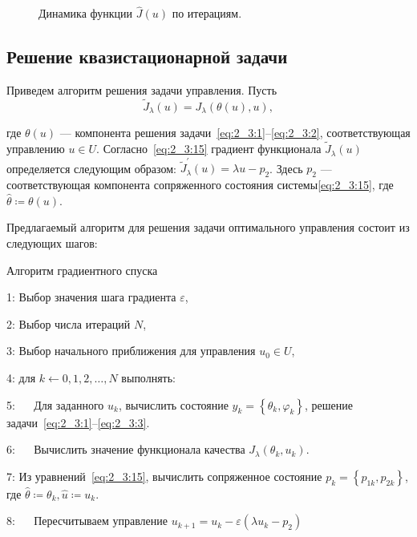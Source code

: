 \begin{figure}[]
    \centering
    \caption{Динамика функции $\hat{J}(u)$ по итерациям.}
    \label{fig:4_3:cost}
\end{figure}


\subsection{Решение квазистационарной задачи}
\label{subsec:ch4/sec3/quasistationary}
Приведем алгоритм решения задачи управления.
Пусть
\[
    \widetilde{J}_{\lambda}(u)=J_{\lambda}(\theta(u), u),
\]

где $\theta(u)$ — компонента решения
задачи~\eqref{eq:2_3:1}--\eqref{eq:2_3:2},
соответствующая управлению $u \in U$.
Согласно~\eqref{eq:2_3:15} градиент функционала
$\widetilde{J}_{\lambda}(u)$ определяется
следующим образом: $\widetilde{J}_{\lambda}^{\prime}(u) = \lambda u-p_{2}$.
Здесь $p_{2}$ — соответствующая компонента сопряженного
состояния системы\eqref{eq:2_3:15}, где $\widehat{\theta}\coloneqq\theta(u)$.


Предлагаемый алгоритм для решения задачи оптимального управления
состоит из следующих шагов:

Алгоритм градиентного спуска

1: Выбор значения шага градиента $\varepsilon$,

2: Выбор числа итераций $N$,

3: Выбор начального приближения для управления $u_{0} \in U$,

4: для $k \leftarrow 0,1,2, \ldots, N$ выполнять:

5: $\quad$ Для заданного $u_{k}$, вычислить состояние
$y_{k}=\left\{\theta_{k}, \varphi_{k}\right\}$, решение
задачи~\eqref{eq:2_3:1}--\eqref{eq:2_3:3}.

6: $\quad$ Вычислить значение функционала качества
$J_{\lambda}\left(\theta_{k}, u_{k}\right)$.

7: Из уравнений~\eqref{eq:2_3:15}, вычислить сопряженное
состояние $p_{k}=\left\{p_{1 k}, p_{2 k}\right\}$,
где $\widehat{\theta} \coloneqq \theta_{k}, \widehat{u} \coloneqq u_{k}$.

8: $\quad$ Пересчитываем управление
$u_{k+1}=u_{k}-\varepsilon\left(\lambda u_{k}-p_{2}\right)$

